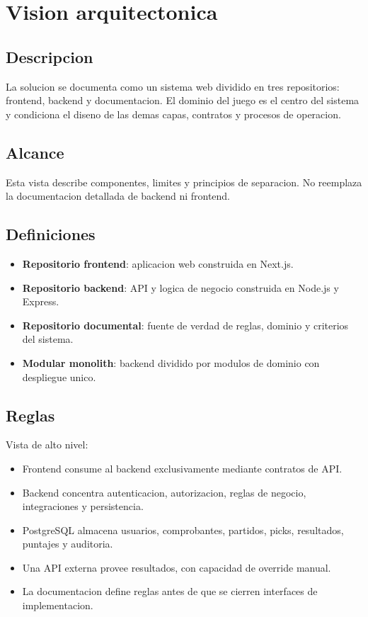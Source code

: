 \section{Vision arquitectonica}

\subsection{Descripcion}

La solucion se documenta como un sistema web dividido en tres repositorios: frontend, backend y documentacion. El dominio del juego es el centro del sistema y condiciona el diseno de las demas capas, contratos y procesos de operacion.

\subsection{Alcance}

Esta vista describe componentes, limites y principios de separacion. No reemplaza la documentacion detallada de backend ni frontend.

\subsection{Definiciones}

\begin{itemize}
  \item \textbf{Repositorio frontend}: aplicacion web construida en Next.js.
  \item \textbf{Repositorio backend}: API y logica de negocio construida en Node.js y Express.
  \item \textbf{Repositorio documental}: fuente de verdad de reglas, dominio y criterios del sistema.
  \item \textbf{Modular monolith}: backend dividido por modulos de dominio con despliegue unico.
\end{itemize}

\subsection{Reglas}

Vista de alto nivel:

\begin{itemize}
  \item Frontend consume al backend exclusivamente mediante contratos de API.
  \item Backend concentra autenticacion, autorizacion, reglas de negocio, integraciones y persistencia.
  \item PostgreSQL almacena usuarios, comprobantes, partidos, picks, resultados, puntajes y auditoria.
  \item Una API externa provee resultados, con capacidad de override manual.
  \item La documentacion define reglas antes de que se cierren interfaces de implementacion.
\end{itemize}

